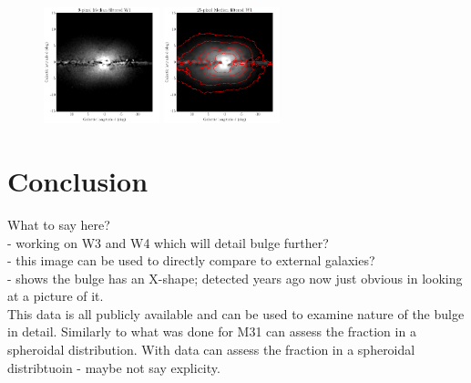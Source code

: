 \documentclass[12pt, preprint]{aastex}
\begin{document}
\begin{figure}
\centering
\includegraphics[width=0.3\textwidth]{xbulge-05}
\includegraphics[width=0.3\textwidth]{xbulge-07}
\caption{
}
\label{fig:contours}
\end{figure}


\section{Conclusion}

What to say here?\\
- working on W3 and W4 which will detail bulge further?\\
- this image can be used to directly compare to external galaxies? \\
- shows the bulge has an X-shape; detected years ago now just obvious in looking at a picture of it. \\
This data is all publicly available and can be used to examine nature of the bulge in detail. Similarly to what was done for M31 can assess the fraction in a spheroidal distribution.
With data can assess the fraction in a spheroidal distribtuoin - maybe not say explicity. 



\end{document}
